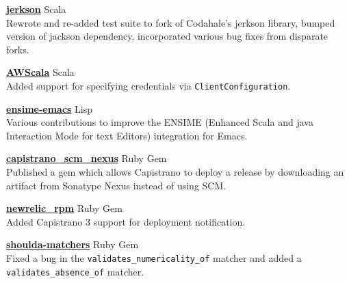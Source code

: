 \documentclass[10pt,letterpaper]{altacv}
\begin{document}

\href{https://github.com/gilt/jerkson}{\textbf{jerkson}} \hfill
{\footnotesize{} Scala} \\
Rewrote and re-added test suite to fork of Codahale's jerkson library,
bumped version of jackson dependency, incorporated various bug fixes
from disparate forks.

\divider

\href{https://github.com/seratch/AWScala}{\textbf{AWScala}} \hfill
{\footnotesize{} Scala} \\
Added support for specifying credentials via
\verb|ClientConfiguration|.

\divider

\href{https://github.com/ensime/ensime-emacs}{\textbf{ensime-emacs}}
\hfill{\footnotesize {} Lisp} \\
Various contributions to improve the ENSIME (Enhanced Scala and java
Interaction Mode for text Editors) integration for Emacs.

\divider

\href{https://github.com/jmpage/capistrano_scm_nexus}{\textbf{capistrano\_scm\_nexus}} \hfill {\footnotesize{} Ruby Gem} \\
Published a gem which allows Capistrano to deploy a release by
downloading an artifact from Sonatype Nexus instead of using SCM.

\divider

\href{https://github.com/newrelic/rpm}{\textbf{newrelic\_rpm}} \hfill {\footnotesize{} Ruby Gem} \\
Added Capistrano 3 support for deployment notification.

\divider

\href{https://github.com/thoughtbot/shoulda-matchers}{\textbf{shoulda-matchers}} \hfill {\footnotesize{} Ruby Gem} \\
Fixed a bug in the \verb|validates_numericality_of| matcher and added a \verb|validates_absence_of| matcher.\\
\end{document}
